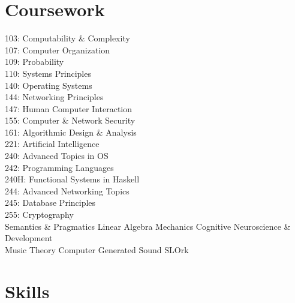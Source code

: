 \documentclass[letterpaper]{deedy-resume} %
\begin{document}
\begin{minipage}[t]{0.33\textwidth}
\section{Coursework}


103: Computability \& Complexity \\
107: Computer Organization \\
109: Probability \\
110: Systems Principles \\
140: Operating Systems \\
144: Networking Principles \\
147: Human Computer Interaction \\
155: Computer \& Network Security \\
161: Algorithmic Design \& Analysis\\
221: Artificial Intelligence \\
240: Advanced Topics in OS \\
242: Programming Languages \\
240H: Functional Systems in Haskell\\
244: Advanced Networking Topics \\
245: Database Principles \\
255: Cryptography \\
\vspace{\topsep} %
Semantics \& Pragmatics \textbullet{} Linear Algebra \textbullet{} Mechanics \textbullet{} Cognitive Neuroscience \& Development \\
Music Theory \textbullet{} Computer Generated Sound \textbullet{} SLOrk \\


\sectionspace %


\section{Skills}


\end{minipage}
\end{document}
